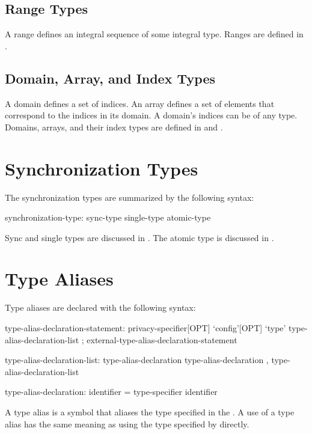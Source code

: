 \subsection{Range Types}
\label{Types_Range_Types}

A range defines an integral sequence of some integral type.  Ranges
are defined in .

\subsection{Domain, Array, and Index Types}
\label{Domain_and_Array_Types}

A domain defines a set of indices. An array defines a set of
elements that correspond to the indices in its domain.
A domain's indices can be of any type.
Domains, arrays, and their index
types are defined in  and .

\section{Synchronization Types}
\label{Synchronization_Types}

The synchronization types are summarized by the following syntax:

\begin{syntax}
synchronization-type:
  sync-type
  single-type
  atomic-type
\end{syntax}

Sync and single types are discussed in .
The atomic type is discussed in .

\clearpage
\section{Type Aliases}
\label{Type_Aliases}

Type aliases are declared with the following syntax:
\begin{syntax}
type-alias-declaration-statement:
  privacy-specifier[OPT] `config'[OPT] `type' type-alias-declaration-list ;
  external-type-alias-declaration-statement

type-alias-declaration-list:
  type-alias-declaration
  type-alias-declaration , type-alias-declaration-list

type-alias-declaration:
  identifier = type-specifier
  identifier
\end{syntax}
A type alias is a symbol that aliases the type specified in the
.  A use of a type alias has the same meaning as using
the type specified by  directly.

